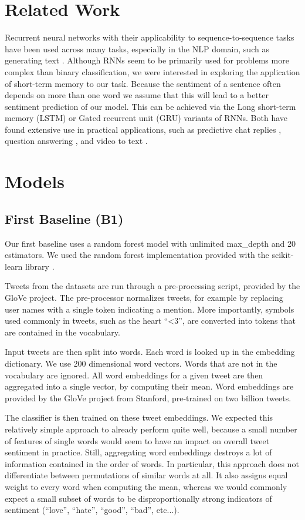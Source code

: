 \documentclass[10pt,conference,compsocconf]{IEEEtran}
\begin{document}
\section{Related Work}

Recurrent neural networks with their applicability to
sequence-to-sequence tasks have been used across many tasks,
especially in the NLP domain, such as generating text \cite{Sutskever}.
Although RNNs seem to be primarily used for problems more
complex than binary classification, we were interested in exploring
the application of short-term memory to our task. 
Because the sentiment of a sentence often depends on more than one word 
we assume that this will lead to a better sentiment prediction of our model.
This can be achieved via the Long short-term memory (LSTM) or 
Gated recurrent unit (GRU) variants of RNNs. Both have found extensive use in practical
applications, such as predictive chat replies \cite{allo},
question answering \cite{DiWang}, and video to text \cite{DBLP}.

\section{Models}

\subsection{First Baseline (B1)} \label{b1}

Our first baseline uses a random forest model with unlimited
max\_depth and 20 estimators. We used the random forest implementation
provided with the scikit-learn library \cite{scikit-learn}.

Tweets from the datasets are run through a pre-processing script,
provided by the GloVe project. The pre-processor normalizes tweets,
for example by replacing user names with a single token indicating a
mention. More importantly, symbols used commonly in tweets, such as
the heart ``\textless3'', are converted into tokens that are contained in the
vocabulary.

Input tweets are then split into words. Each word is looked up in the
embedding dictionary. We use 200 dimensional word vectors. Words that
are not in the vocabulary are ignored. All word embeddings for a given
tweet are then aggregated into a single vector, by computing their
mean. Word embeddings are provided by the GloVe \cite{glove} project
from Stanford, pre-trained on two billion tweets.

The classifier is then trained on these tweet embeddings. We expected
this relatively simple approach to already perform quite well, because
a small number of features of single words would seem to have an
impact on overall tweet sentiment in practice. Still, aggregating word
embeddings destroys a lot of information contained in the order of
words. In particular, this approach does not differentiate between
permutations of similar words at all. It also assigns equal weight to
every word when computing the mean, whereas we would commonly expect a
small subset of words to be disproportionally strong indicators of
sentiment (``love'', ``hate'', ``good'', ``bad'', etc...).
\end{document}
